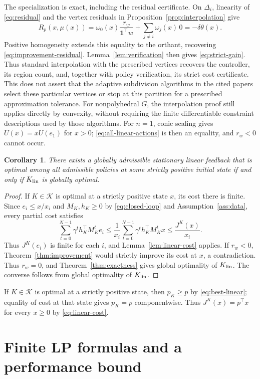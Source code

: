 \documentclass[10pt]{article}
\newtheorem{corollary}{Corollary}
\newcommand{\one}{\mathbf 1}
\begin{document}
The specialization is exact, including the residual certificate. On $\Delta_i$, linearity of \eqref{eq:residual} and the vertex residuals in Proposition~\ref{prop:interpolation} give
\[
 R_p(x,\mu(x))
 =\omega_0(x)\frac{r_w}{\one^\top w}+\sum_{j\ne i}\omega_j(x)\,0
 =-\delta\theta(x).
\]
Positive homogeneity extends this equality to the orthant, recovering \eqref{eq:improvement-residual}. Lemma~\ref{lem:verification} then gives \eqref{eq:strict-gain}. Thus standard interpolation with the prescribed vertices recovers the controller, its region count, and, together with policy verification, its strict cost certificate. This does not assert that the adaptive subdivision algorithms in the cited papers select these particular vertices or stop at this partition for a prescribed approximation tolerance. For nonpolyhedral $G$, the interpolation proof still applies directly by convexity, without requiring the finite differentiable constraint descriptions used by those algorithms. For $n=1$, conic scaling gives $U(x)=xU(e_1)$ for $x>0$; \eqref{eq:all-linear-actions} is then an equality, and $r_w<0$ cannot occur.

\begin{corollary}
\label{cor:one-state}
There exists a globally admissible stationary linear feedback that is optimal among all admissible policies at some strictly positive initial state if and only if $K_{\rm lin}$ is globally optimal.
\end{corollary}
\begin{proof}
If $K\in\mathcal K$ is optimal at a strictly positive state $x$, its cost there is finite. Since $e_i\le x/x_i$ and $M_K,h_K\ge0$ by \eqref{eq:closed-loop} and Assumption~\ref{ass:data}, every partial cost satisfies
\[
 \sum_{t=0}^{N-1}\gamma^t h_K^\top M_K^t e_i
 \le\frac{1}{x_i}\sum_{t=0}^{N-1}\gamma^t h_K^\top M_K^t x
 \le\frac{J^K(x)}{x_i}.
\]
Thus $J^K(e_i)$ is finite for each $i$, and Lemma~\ref{lem:linear-cost} applies. If $r_w<0$, Theorem~\ref{thm:improvement} would strictly improve its cost at $x$, a contradiction. Thus $r_w=0$, and Theorem~\ref{thm:exactness} gives global optimality of $K_{\rm lin}$. The converse follows from global optimality of $K_{\rm lin}$.
\end{proof}

If $K\in\mathcal K$ is optimal at a strictly positive state, then $p_K\ge p$ by \eqref{eq:best-linear}; equality of cost at that state gives $p_K=p$ componentwise. Thus $J^K(x)=p^\top x$ for every $x\ge0$ by \eqref{eq:linear-cost}.

\section{Finite LP formulas and a performance bound}
\end{document}
